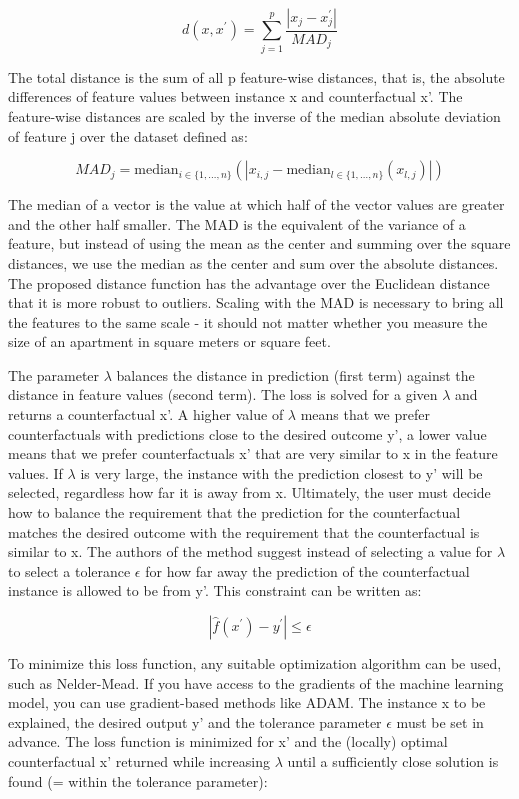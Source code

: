 \documentclass[
  12pt,
]{krantz}
\begin{document}
\[d(x,x^\prime)=\sum_{j=1}^p\frac{|x_j-x^\prime_j|}{MAD_j}\]

The total distance is the sum of all p feature-wise distances, that is, the absolute differences of feature values between instance x and counterfactual x'.
The feature-wise distances are scaled by the inverse of the median absolute deviation of feature j over the dataset defined as:

\[MAD_j=\text{median}_{i\in{}\{1,\ldots,n\}}(|x_{i,j}-\text{median}_{l\in{}\{1,\ldots,n\}}(x_{l,j})|)\]

The median of a vector is the value at which half of the vector values are greater and the other half smaller.
The MAD is the equivalent of the variance of a feature, but instead of using the mean as the center and summing over the square distances, we use the median as the center and sum over the absolute distances.
The proposed distance function has the advantage over the Euclidean distance that
it is more robust to outliers.
Scaling with the MAD is necessary to bring all the features to the same scale - it should not matter whether you measure the size of an apartment in square meters or square feet.

The parameter \(\lambda\) balances the distance in prediction (first term) against the distance in feature values (second term).
The loss is solved for a given \(\lambda\) and returns a counterfactual x'.
A higher value of \(\lambda\) means that we prefer counterfactuals with predictions close to the desired outcome y', a lower value means that we prefer counterfactuals x' that are very similar to x in the feature values.
If \(\lambda\) is very large, the instance with the prediction closest to y' will be selected, regardless how far it is away from x.
Ultimately, the user must decide how to balance the requirement that the prediction for the counterfactual matches the desired outcome with the requirement that the counterfactual is similar to x.
The authors of the method suggest instead of selecting a value for \(\lambda\) to select a tolerance \(\epsilon\) for how far away the prediction of the counterfactual instance is allowed to be from y'.
This constraint can be written as:

\[|\hat{f}(x^\prime)-y^\prime|\leq\epsilon\]

To minimize this loss function, any suitable optimization algorithm can be used, such as Nelder-Mead.
If you have access to the gradients of the machine learning model, you can use gradient-based methods like ADAM.
The instance x to be explained, the desired output y' and the tolerance parameter \(\epsilon\) must be set in advance.
The loss function is minimized for x' and the (locally) optimal counterfactual x' returned while increasing \(\lambda\) until a sufficiently close solution is found (= within the tolerance parameter):
\end{document}
